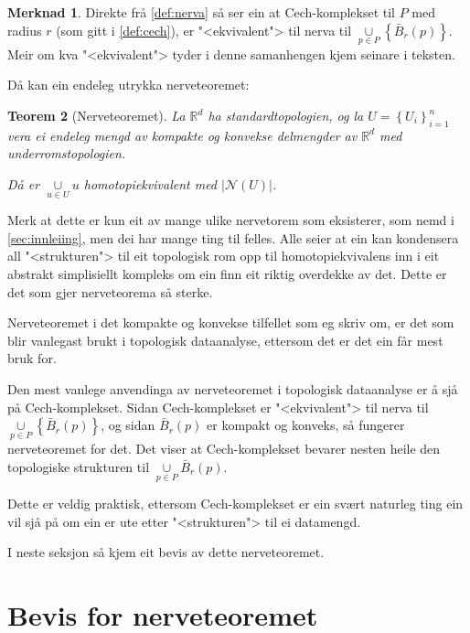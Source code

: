 \documentclass[a4paper, 12pt, norsk]{article}
\theoremstyle{plain}
\newtheorem{theorem}{Teorem}[section]
\theoremstyle{definition}
\newtheorem{remark}[theorem]{Merknad}
\newcommand{\Rb}{\mathbb{R}}
\newcommand{\Nc}{\mathcal{N}}
\newcommand{\union}{ \mathop{\cup}\limits }
\newcommand{\gr}[1]{ \lvert #1 \rvert } %
\newcommand{\set}[1]{ \left\{ #1 \right\} } %
\begin{document}
\begin{remark} \label{rem:cech-ekvivalent}
	Direkte frå \autoref{def:nerva} så ser ein at Cech-komplekset til $P$ med radius $r$ (som gitt i \autoref{def:cech}), er "<ekvivalent"> til nerva til $\union_{p \in P} \left \{ \bar{B}_r(p) \right \}$. Meir om kva "<ekvivalent"> tyder i denne samanhengen kjem seinare i teksten.
\end{remark}

Då kan ein endeleg utrykka nerveteoremet:

\begin{theorem}[Nerveteoremet] \label{thm:nerveteoremet}
	La \( \Rb^d \) ha standardtopologien, og la \( U = \set{U_i}_{i=1}^n \) vera ei endeleg mengd av kompakte og konvekse delmengder av \( \Rb^d \) med underromstopologien.
	
	Då er \( \union_{u \in U} u \) homotopiekvivalent med \( \gr{\Nc(U)} \).
\end{theorem}

Merk at dette er kun eit av mange ulike nervetorem som eksisterer, som nemd i \autoref{sec:innleiing}, men dei har mange ting til felles. Alle seier at ein kan kondensera all "<strukturen"> til eit topologisk rom opp til homotopiekvivalens inn i eit abstrakt simplisiellt kompleks om ein finn eit riktig overdekke av det. Dette er det som gjer nerveteorema så sterke.

Nerveteoremet i det kompakte og konvekse tilfellet som eg skriv om, er det som blir vanlegast brukt i topologisk dataanalyse, ettersom det er det ein får mest bruk for.

Den mest vanlege anvendinga av nerveteoremet i topologisk dataanalyse er å sjå på Cech-komplekset. Sidan Cech-komplekset er "<ekvivalent"> til nerva til \( \union_{p \in P} \left \{ \bar{B}_r(p) \right \} \), og sidan \( \bar{B}_r(p) \) er kompakt og konveks, så fungerer nerveteoremet for det. Det viser at Cech-komplekset bevarer nesten heile den topologiske strukturen til \( \union_{p \in P} \bar{B}_r(p) \).

Dette er veldig praktisk, ettersom Cech-komplekset er ein svært naturleg ting ein vil sjå på om ein er ute etter "<strukturen"> til ei datamengd.

I neste seksjon så kjem eit bevis av dette nerveteoremet.

\section{Bevis for nerveteoremet}
\end{document}
